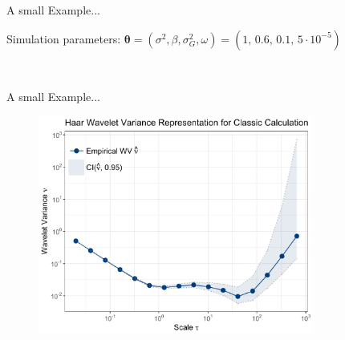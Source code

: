 \documentclass[envcountsect,usenames,dvipsnames]{beamer}
\theoremstyle{mystyle}
\begin{document}
\begin{frame}{A small Example...}
		\begin{exampleblock}{Simulation parameters:}
			$\bm{\theta} = \left( \sigma^2 ,\beta, \sigma_{G}^2 , \omega \right) = \left( 1, \, 0.6, \, 0.1, \, 5 \cdot 10^{-5} \right)$
		\end{exampleblock}
\begin{figure}
  \centering
  ~ %
  ~ %
\end{figure}
\end{frame}

\begin{frame}{A small Example...}
	\begin{figure}
	    \centering
	  \includegraphics[width = 9cm]{Images/wv_example.pdf}
	\end{figure}
\end{frame}
\end{document}
